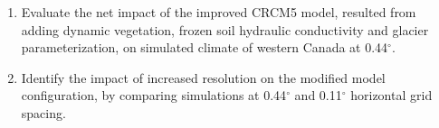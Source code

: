 \documentclass[a0b,landscape]{a0poster}
\begin{document}
\begin{multicols*}{4}
\vspace{1cm}
\begin{tcolorbox}[colback=white,colframe=green!40!black,adjusted title={Main objectives}]
  \begin{enumerate}
  \item Evaluate the net impact of the improved CRCM5 model, resulted from adding
        dynamic vegetation, frozen soil hydraulic conductivity and glacier
        parameterization, on simulated climate of western Canada at 0.44$^\circ$.
  \item Identify the impact of increased resolution on the modified model configuration,
        by comparing simulations at 0.44$^\circ$ and 0.11$^\circ$ horizontal grid
        spacing.
  \end{enumerate}
\end{tcolorbox}



\end{multicols*}
\end{document}
